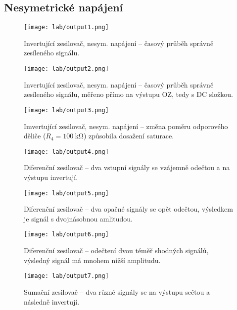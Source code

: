 \subsection{Nesymetrické napájení}
\begin{figure}[h!]
    \centering
    \texttt{[image: lab/output1.png]}
    \caption{Invertující zesilovač, nesym. napájení -- časový průběh správně zesíleného signálu.}
    \label{fig:lab/output1.png}
\end{figure}

\begin{figure}[h!]
    \centering
    \texttt{[image: lab/output2.png]}
    \caption{Invertující zesilovač, nesym. napájení -- časový průběh správně zesíleného signálu, měřeno přímo na výstupu OZ, tedy s DC složkou.}
    \label{fig:lab-output2-png}
\end{figure}

\begin{figure}[h!]
    \centering
    \texttt{[image: lab/output3.png]}
    \caption{Imvertující zesilovač, nesym. napájení -- změna poměru odporového děliče (\(R_4=\qty{100}{\kilo\ohm}\)) způsobila dosažení saturace.}
    \label{fig:lab-output3-png}
\end{figure}

\begin{figure}[h!]
    \centering
    \texttt{[image: lab/output4.png]}
    \caption{Diferenční zesilovač -- dva vstupní signály se vzájemně odečtou a na výstupu invertují.}
    \label{fig:lab-output4-png}
\end{figure}


\begin{figure}[h!]
    \centering
    \texttt{[image: lab/output5.png]}
    \caption{Diferenční zesilovač -- dva opačné signály se opět odečtou, výsledkem je signál s dvojnásobnou amlitudou.}
    \label{fig:lab-output5-png}
\end{figure}

\begin{figure}[h!]
    \centering
    \texttt{[image: lab/output6.png]}
    \caption{Diferenční zesilovač -- odečtení dvou téměř shodných signálů, výsledný signál má mnohem nižší amplitudu.}
    \label{fig:lab-output6-png}
\end{figure}

\begin{figure}[h!]
    \centering
    \texttt{[image: lab/output7.png]}
    \caption{Sumační zesilovač -- dva různé signály se na výstupu sečtou a následně invertují.}
    \label{fig:lab-output7-png}
\end{figure}

